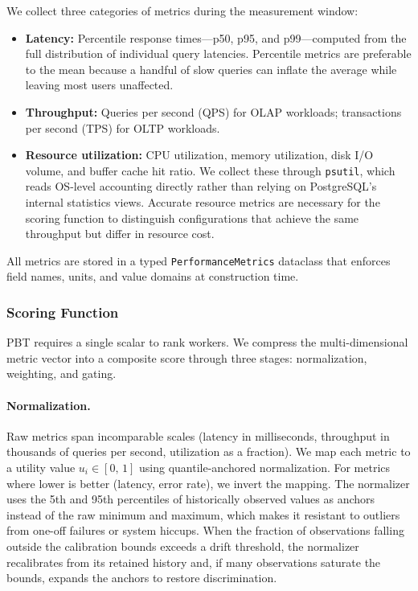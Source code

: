 We collect three categories of metrics during the measurement window:

\begin{itemize}
  \item \textbf{Latency:} Percentile response times---p50, p95, and
    p99---computed from the full distribution of individual query latencies.
    Percentile metrics are preferable to the mean because a handful of slow
    queries can inflate the average while leaving most users unaffected.
  \item \textbf{Throughput:} Queries per second (QPS) for OLAP workloads;
    transactions per second (TPS) for OLTP workloads.
  \item \textbf{Resource utilization:} CPU utilization, memory utilization,
    disk I/O volume, and buffer cache hit ratio.  We collect these through
    \texttt{psutil}, which reads OS-level accounting directly rather than
    relying on PostgreSQL's internal statistics views.  Accurate resource
    metrics are necessary for the scoring function to distinguish
    configurations that achieve the same throughput but differ in resource
    cost.
\end{itemize}

All metrics are stored in a typed \texttt{PerformanceMetrics} dataclass
that enforces field names, units, and value domains at construction time.

\subsubsection{Scoring Function}
\label{sssec:scoring}

PBT requires a single scalar to rank workers.  We compress the
multi-dimensional metric vector into a composite score through three stages:
normalization, weighting, and gating.

\paragraph{Normalization.}
Raw metrics span incomparable scales (latency in milliseconds, throughput in
thousands of queries per second, utilization as a fraction).  We map each
metric to a utility value $u_i \in [0,\,1]$ using quantile-anchored
normalization.  For metrics where lower is better (latency, error rate), we
invert the mapping.  The normalizer uses the 5th and 95th percentiles of
historically observed values as anchors instead of the raw minimum and
maximum, which makes it resistant to outliers from one-off failures or system
hiccups.  When the fraction of observations falling outside the calibration
bounds exceeds a drift threshold, the normalizer recalibrates from its
retained history and, if many observations saturate the bounds, expands the
anchors to restore discrimination.

